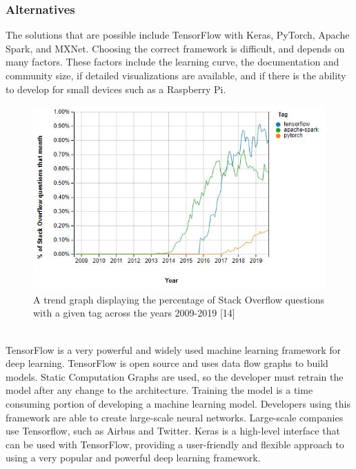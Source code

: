 \documentclass[12pt,journal,compsoc]{IEEEtran}
\newenvironment{subs}
  {\adjustwidth{1em}{0pt}}
  {\endadjustwidth}
\begin{document}
\begin{subs}
\begin{subs}
\subsubsection{Alternatives}
The solutions that are possible include TensorFlow with Keras, PyTorch, Apache Spark, and MXNet. Choosing the correct framework is difficult, and depends on many factors. These factors include the learning curve, the documentation and community size, if detailed visualizations are available, and if there is the ability to develop for small devices such as a Raspberry Pi.

\begin{figure}[H]
\centering
\includegraphics[width=5in]{images/train_trends.JPG}
\caption{A trend graph displaying the percentage of Stack Overflow questions with a given tag across the years 2009-2019 [14]}
\label{fig:train_trends}
\end{figure}

\begin{subs}
\\
TensorFlow is a very powerful and widely used machine learning framework for deep learning. TensorFlow is open source and uses data flow graphs to build models. Static Computation Graphs are used, so the developer must retrain the model after any change to the architecture. Training the model is a time consuming portion of developing a machine learning model. Developers using this framework are able to create large-scale neural networks. Large-scale companies use Tensorflow, such as Airbus and Twitter. Keras is a high-level interface that can be used with TensorFlow, providing a user-friendly and flexible approach to using a very popular and powerful deep learning framework.


\end{subs}
\end{subs}
\end{subs}
\end{document}

